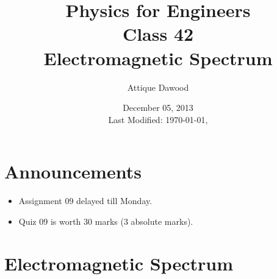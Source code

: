 \documentclass[12pt,a4paper]{article}
\title{\vspace{-3cm}Physics for Engineers\\Class 42\\Electromagnetic Spectrum}
\author{Attique Dawood}
\date{December 05, 2013\\[0.2cm] Last Modified: \today, \currenttime}
\begin{document}
\maketitle
\section{Announcements}
\begin{itemize}
\item Assignment 09 delayed till Monday.
\item Quiz 09 is worth 30 marks (3 absolute marks).
\end{itemize}
\section{Electromagnetic Spectrum}


\end{document}
